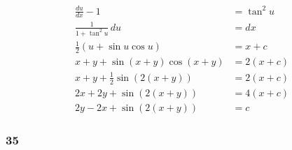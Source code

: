 \documentclass{article}
\begin{document}
\begin{align*}
  \frac{du}{dx} - 1                    & = \tan^2 u  \\
  \frac{1}{1 + \tan^2 u} \,du          & = dx        \\
  \frac{1}{2} (u + \sin u \cos u)      & = x + c     \\
  x + y + \sin (x + y) \cos (x + y)    & = 2 (x + c) \\
  x + y + \frac{1}{2} \sin (2 (x + y)) & = 2 (x + c) \\
  2 x + 2 y + \sin (2 (x + y))         & = 4 (x + c) \\
  2 y - 2 x + \sin (2 (x + y))         & = c
\end{align*}

\subsubsection{35}
\end{document}
